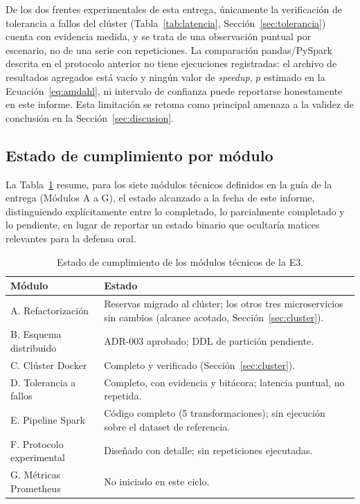 \documentclass[10pt,twocolumn]{article}
\begin{document}
De los dos frentes experimentales de esta entrega, únicamente la
verificación de tolerancia a fallos del clúster (Tabla~\ref{tab:latencia},
Sección~\ref{sec:tolerancia}) cuenta con evidencia medida, y se trata de
una observación puntual por escenario, no de una serie con repeticiones. La
comparación pandas/PySpark descrita en el protocolo anterior no tiene
ejecuciones registradas: el archivo de resultados agregados está vacío y
ningún valor de \emph{speedup}, $p$ estimado en la Ecuación~\eqref{eq:amdahl},
ni intervalo de confianza puede reportarse honestamente en este informe.
Esta limitación se retoma como principal amenaza a la validez de conclusión
en la Sección~\ref{sec:discusion}.

\subsection{Estado de cumplimiento por módulo}

La Tabla~\ref{tab:modulos} resume, para los siete módulos técnicos
definidos en la guía de la entrega (Módulos A a G), el estado alcanzado a
la fecha de este informe, distinguiendo explícitamente entre lo completado,
lo parcialmente completado y lo pendiente, en lugar de reportar un estado
binario que ocultaría matices relevantes para la defensa oral.

\begin{table}[t]
\centering
\caption{Estado de cumplimiento de los módulos técnicos de la E3.}
\label{tab:modulos}
\small
\begin{tabular}{@{}p{2.6cm}p{5cm}@{}}
\toprule
\textbf{Módulo} & \textbf{Estado} \\
\midrule
A. Refactorización & Reservas migrado al clúster; los otros tres
microservicios sin cambios (alcance acotado, Sección~\ref{sec:cluster}). \\
B. Esquema distribuido & ADR-003 aprobado; DDL de partición pendiente. \\
C. Clúster Docker & Completo y verificado (Sección~\ref{sec:cluster}). \\
D. Tolerancia a fallos & Completo, con evidencia y bitácora; latencia
puntual, no repetida. \\
E. Pipeline Spark & Código completo (5 transformaciones); sin ejecución
sobre el dataset de referencia. \\
F. Protocolo experimental & Diseñado con detalle; sin repeticiones
ejecutadas. \\
G. Métricas Prometheus & No iniciado en este ciclo. \\
\bottomrule
\end{tabular}
\end{table}
\end{document}

